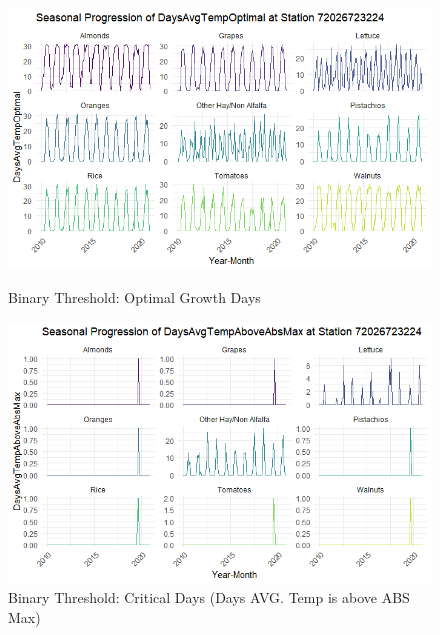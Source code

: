 \documentclass{article}
\begin{document}
\begin{figure}[H]
  \centering
  \begin{minipage}{0.48\textwidth}
    \centering
    \includegraphics[width=\linewidth]{Final_Report/images/Index_Binary_Within_Optimal.png}
    \caption{Binary Threshold: Optimal Growth Days}
    \label{fig:left}
  \end{minipage}\hfill %
  \begin{minipage}{0.48\textwidth}
    \centering
    \includegraphics[width=\linewidth]{Final_Report/images/Index_Binary_Heat_Critical.png}
    \caption{Binary Threshold: Critical Days (Days AVG. Temp is above ABS Max)}
    \label{fig:right}
  \end{minipage}
\end{figure}
\end{document}
